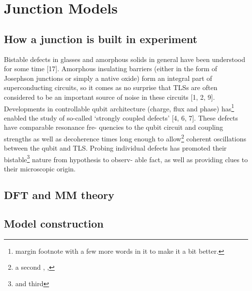 \chapter{Junction Models}

\section{How a junction is built in experiment}
Bistable defects  in glasses and amorphous solids in general have been understood for some time [17].
Amorphous insulating barriers (either in the form of Josephson junctions or simply a native oxide) form an integral part of superconducting circuits, so it comes as no surprise that TLSs are often considered to be an important source of noise in these circuits [1, 2, 9]. Developments in controllable
qubit architecture (charge, flux and phase) has\footnote{margin footnote with a few more words in it to make it a bit better.} enabled the study of so-called
‘strongly coupled defects’ [4, 6, 7]. These defects have comparable resonance fre-
quencies to the qubit circuit and coupling strengths as well as decoherence times
long enough to allow\footnote{a second \the\marginparwidth, \the\marginparsep, \the\marginparpush} coherent oscillations between the qubit and TLS. Probing
individual defects has promoted their bistable\footnote{and third} nature from hypothesis to observ-
able fact, as well as providing clues to their microscopic origin.
\section{DFT and MM theory}
\section{Model construction}
